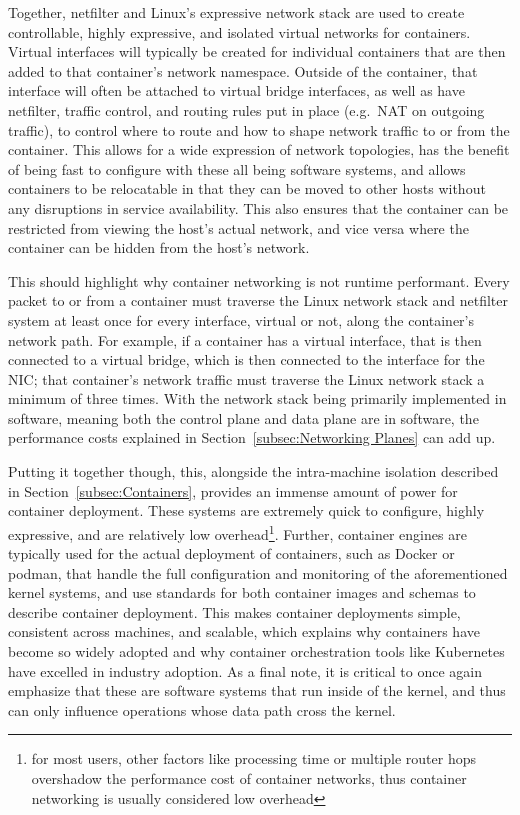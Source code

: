 \documentclass[12pt,titlepage]{article}
\begin{document}
Together, netfilter and Linux's expressive network stack are used to create controllable, highly expressive, and isolated virtual networks for containers.
Virtual interfaces will typically be created for individual containers that are then added to that container's network namespace.
Outside of the container, that interface will often be attached to virtual bridge interfaces, as well as have netfilter, traffic control, and routing rules put in place (e.g.\ NAT on outgoing traffic), to control where to route and how to shape network traffic to or from the container.
This allows for a wide expression of network topologies, has the benefit of being fast to configure with these all being software systems, and allows containers to be relocatable in that they can be moved to other hosts without any disruptions in service availability.
This also ensures that the container can be restricted from viewing the host's actual network, and vice versa where the container can be hidden from the host's network.

This should highlight why container networking is not runtime performant.
Every packet to or from a container must traverse the Linux network stack and netfilter system at least once for every interface, virtual or not, along the container's network path.
For example, if a container has a virtual interface, that is then connected to a virtual bridge, which is then connected to the interface for the NIC\@; that container's network traffic must traverse the Linux network stack a minimum of three times.
With the network stack being primarily implemented in software, meaning both the control plane and data plane are in software, the performance costs explained in Section~\ref{subsec:Networking Planes} can add up.

Putting it together though, this, alongside the intra-machine isolation described in Section~\ref{subsec:Containers}, provides an immense amount of power for container deployment.
These systems are extremely quick to configure, highly expressive, and are relatively low overhead\footnote{for most users, other factors like processing time or multiple router hops overshadow the performance cost of container networks, thus container networking is usually considered low overhead}.
Further, container engines are typically used for the actual deployment of containers, such as Docker or podman, that handle the full configuration and monitoring of the aforementioned kernel systems, and use standards for both container images and schemas to describe container deployment.
This makes container deployments simple, consistent across machines, and scalable, which explains why containers have become so widely adopted and why container orchestration tools like Kubernetes have excelled in industry adoption.
As a final note, it is critical to once again emphasize that these are software systems that run inside of the kernel, and thus can only influence operations whose data path cross the kernel.
\end{document}
